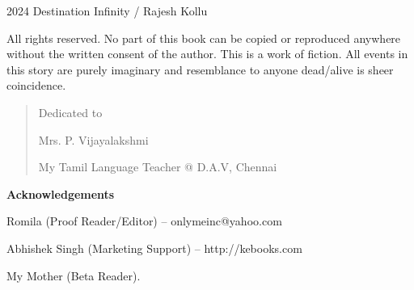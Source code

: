 \begin{center}
\HUGE\textsf{\thetitle}
\end{center}
\cleardoublepage

\begin{center}
\HUGE\textsf{\thetitle}
\end{center}

\begin{center}
\LARGE\textsf{\theauthor}
\end{center}
\clearpage

\begingroup
\footnotesize
\setlength{\parindent}{0pt}
\setlength{\parskip}{\baselineskip}

\textcopyright{} 2024 Destination Infinity / Rajesh Kollu

All rights reserved. No part of this book can be copied or reproduced anywhere
without the written consent of the author. This is a work of fiction. All events
in this story are purely imaginary and resemblance to anyone dead/alive is sheer
coincidence.

\endgroup
\clearpage

\begin{quote}
\begin{center}Dedicated to

\LARGE
Mrs. P. Vijayalakshmi
\normalsize

My Tamil Language Teacher @ D.A.V, Chennai
\end{center}
\end{quote}

\vfill

\textbf{Acknowledgements}

Romila (Proof Reader/Editor) – onlymeinc@yahoo.com


Abhishek Singh (Marketing Support) – http://kebooks.com

My Mother (Beta Reader).


\clearpage